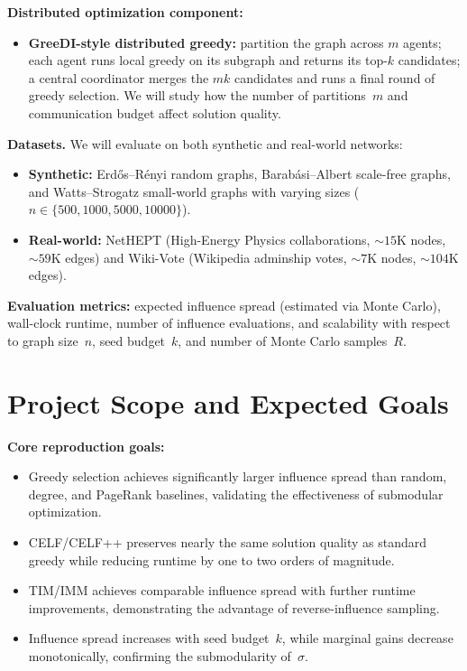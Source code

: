 \documentclass[10pt]{article}
\begin{document}
\textbf{Distributed optimization component:}
\begin{itemize}
    \item \textbf{GreeDI-style distributed greedy:} partition the graph across
    $m$ agents; each agent runs local greedy on its subgraph and returns its
    top-$k$ candidates; a central coordinator merges the $mk$ candidates and
    runs a final round of greedy selection. We will study how the number of
    partitions~$m$ and communication budget affect solution quality.
\end{itemize}

\textbf{Datasets.}
We will evaluate on both synthetic and real-world networks:
\begin{itemize}
    \item \textbf{Synthetic:} Erd\H{o}s--R\'enyi random graphs,
    Barab\'asi--Albert scale-free graphs, and Watts--Strogatz small-world
    graphs with varying sizes ($n \in \{500, 1000, 5000, 10000\}$).
    \item \textbf{Real-world:} NetHEPT (High-Energy Physics collaborations,
    ${\sim}15$K nodes, ${\sim}59$K edges) and Wiki-Vote (Wikipedia
    adminship votes, ${\sim}7$K nodes, ${\sim}104$K edges).
\end{itemize}

\textbf{Evaluation metrics:}
expected influence spread (estimated via Monte Carlo), wall-clock runtime,
number of influence evaluations, and scalability with respect to graph
size~$n$, seed budget~$k$, and number of Monte Carlo samples~$R$.

\section{Project Scope and Expected Goals}

\textbf{Core reproduction goals:}
\begin{itemize}
    \item Greedy selection achieves significantly larger influence spread than
    random, degree, and PageRank baselines, validating the effectiveness of
    submodular optimization.
    \item CELF/CELF++ preserves nearly the same solution quality as standard
    greedy while reducing runtime by one to two orders of magnitude.
    \item TIM/IMM achieves comparable influence spread with further runtime
    improvements, demonstrating the advantage of reverse-influence sampling.
    \item Influence spread increases with seed budget~$k$, while marginal
    gains decrease monotonically, confirming the submodularity of~$\sigma$.
\end{itemize}
\end{document}
